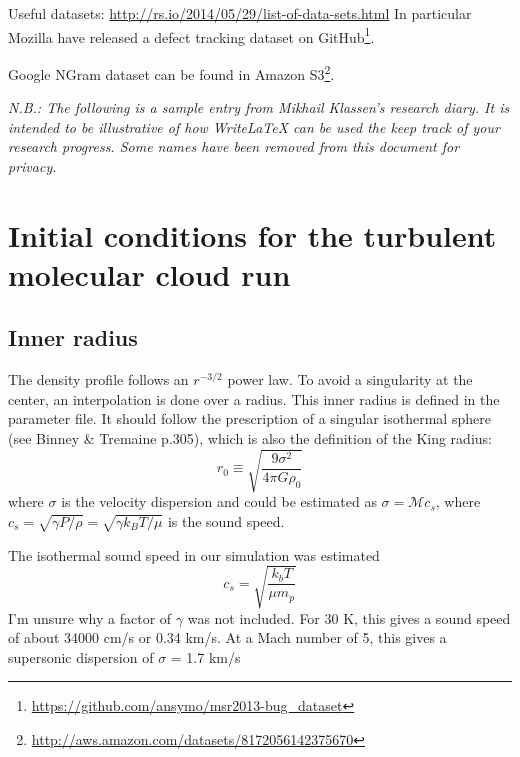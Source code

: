 \documentclass[a4paper]{tufte-handout}
\begin{document}
\hrulefill



Useful datasets: \url{http://rs.io/2014/05/29/list-of-data-sets.html} In particular Mozilla have released a defect tracking dataset on GitHub\footnote{\url{https://github.com/ansymo/msr2013-bug_dataset}}\citep{Lamkanfi+13}.

Google NGram dataset can be found in Amazon S3\footnote{\url{http://aws.amazon.com/datasets/8172056142375670}}.

\hrulefill



\textit{N.B.: The following is a sample entry from Mikhail Klassen's research diary. It is intended to be illustrative of how WriteLaTeX can be used the keep track of your research progress. Some names have been removed from this document for privacy.}

\section*{Initial conditions for the turbulent molecular cloud run}

\subsection*{Inner radius}

The density profile follows an $r^{-3/2}$ power law. To avoid a singularity at the center, an interpolation is done over a radius. This inner radius is defined in the parameter file. It should follow the prescription of a singular isothermal sphere (see Binney \& Tremaine p.305), which is also the definition of the King radius:
\begin{equation}
r_0 \equiv \sqrt{\frac{9\sigma^2}{4\pi G\rho_0}}
\end{equation}
where $\sigma$ is the velocity dispersion and could be estimated as $\sigma = \mathcal{M} c_s$, where $c_s = \sqrt{\gamma P/\rho} = \sqrt{\gamma k_B T / \mu}$ is the sound speed.

The isothermal sound speed in our simulation was estimated
\begin{equation}
c_s = \sqrt{\frac{k_b T}{\mu m_p}}
\end{equation}
I'm unsure why a factor of $\gamma$ was not included. For 30 K, this gives a sound speed of about 34000 cm/s or 0.34 km/s. At a Mach number of 5, this gives a supersonic dispersion of $\sigma$ = 1.7 km/s
\end{document}

